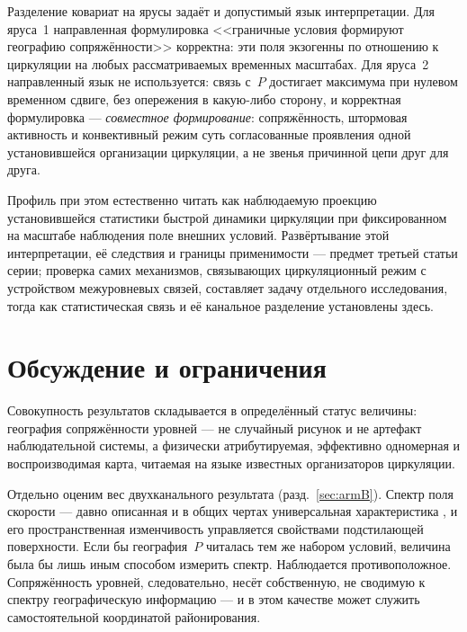 \documentclass[11pt,a4paper]{article}
\begin{document}
Разделение ковариат на ярусы задаёт и допустимый язык интерпретации. Для яруса~1 направленная формулировка <<граничные условия формируют географию сопряжённости>> корректна: эти поля экзогенны по отношению к циркуляции на любых рассматриваемых временных масштабах. Для яруса~2 направленный язык не используется: связь с~$P$ достигает максимума при нулевом временном сдвиге, без опережения в какую-либо сторону, и корректная формулировка --- \emph{совместное формирование}: сопряжённость, штормовая активность и конвективный режим суть согласованные проявления одной установившейся организации циркуляции, а не звенья причинной цепи друг для друга.

Профиль при этом естественно читать как наблюдаемую проекцию установившейся статистики быстрой динамики циркуляции при фиксированном на масштабе наблюдения поле внешних условий. Развёртывание этой интерпретации, её следствия и границы применимости --- предмет третьей статьи серии; проверка самих механизмов, связывающих циркуляционный режим с устройством межуровневых связей, составляет задачу отдельного исследования, тогда как статистическая связь и её канальное разделение установлены здесь.

\section{Обсуждение и ограничения}
\label{sec:limitations}

Совокупность результатов складывается в определённый статус величины: география сопряжённости уровней --- не случайный рисунок и не артефакт наблюдательной системы, а физически атрибутируемая, эффективно одномерная и воспроизводимая карта, читаемая на языке известных организаторов циркуляции.

Отдельно оценим вес двухканального результата (разд.~\ref{sec:armB}). Спектр поля скорости --- давно описанная и в общих чертах универсальная характеристика \cite{NastromGage1985,Lovejoy2011}, и его пространственная изменчивость управляется свойствами подстилающей поверхности. Если бы география~$P$ читалась тем же набором условий, величина была бы лишь иным способом измерить спектр. Наблюдается противоположное. Сопряжённость уровней, следовательно, несёт собственную, не сводимую к спектру географическую информацию --- и в этом качестве может служить самостоятельной координатой районирования.
\end{document}
